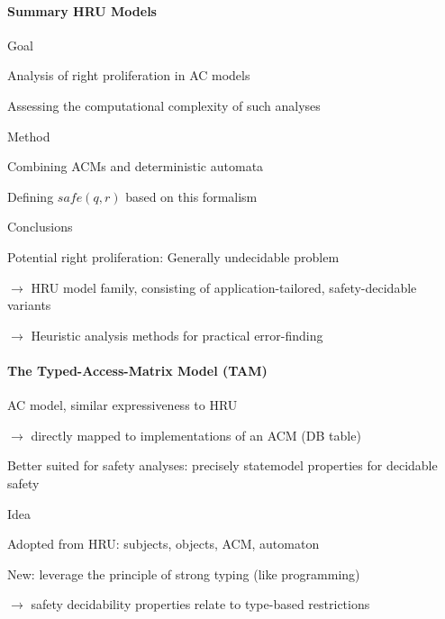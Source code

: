 \documentclass[a4paper]{article}
\begin{document}
\begin{multicols}{3}
    \paragraph{Summary HRU Models}
    Goal
    \begin{itemize*}
        \item Analysis of right proliferation in AC models
        \item Assessing the computational complexity of such analyses
    \end{itemize*}

    Method
    \begin{itemize*}
        \item Combining ACMs and deterministic automata
        \item Defining $safe(q,r)$ based on this formalism
    \end{itemize*}

    Conclusions
    \begin{itemize*}
        \item Potential right proliferation: Generally undecidable problem
        \item $\rightarrow$ HRU model family, consisting of application-tailored, safety-decidable variants
        \item $\rightarrow$ Heuristic analysis methods for practical error-finding
    \end{itemize*}

    \paragraph{The Typed-Access-Matrix Model (TAM)}
    \begin{itemize*}
        \item AC model, similar expressiveness to HRU
        \item $\rightarrow$ directly mapped to implementations of an ACM (DB table)
        \item Better suited for safety analyses: precisely statemodel properties for decidable safety
    \end{itemize*}

    Idea
    \begin{itemize*}
        \item Adopted from HRU: subjects, objects, ACM, automaton
        \item New: leverage the principle of strong typing (like programming)
        \item $\rightarrow$  safety decidability properties relate to type-based restrictions
    \end{itemize*}


\end{multicols}
\end{document}
